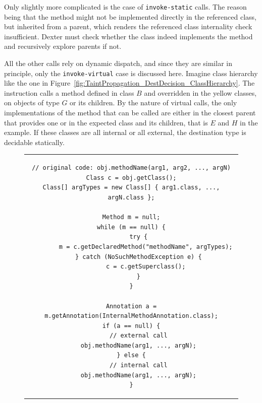 \documentclass[12pt,twoside,notitlepage]{report}
\begin{document}
Only slightly more complicated is the case of \verb$invoke-static$ calls. The reason being that the method might not be implemented directly in the referenced class, but inherited from a parent, which renders the referenced class internality check insufficient. Dexter must check whether the class indeed implements the method and recursively explore parents if not.

All the other calls rely on dynamic dispatch, and since they are similar in principle, only the \verb$invoke-virtual$ case is discussed here. Imagine class hierarchy like the one in Figure~\ref{fig:TaintPropagation_DestDecision_ClassHierarchy}. The instruction calls a method defined in class $B$ and overridden in the yellow classes, on objects of type $G$ or its children. By the nature of virtual calls, the only implementations of the method that can be called are either in the closest parent that provides one or in the expected class and its children, that is $E$ and $H$ in the example. If these classes are all internal or all external, the destination type is decidable statically. 

\begin{figure}
	\centering
	\begin{tabular}{c}
	\begin{lstlisting}
// original code: obj.methodName(arg1, arg2, ..., argN)
Class c = obj.getClass();
Class[] argTypes = new Class[] { arg1.class, ..., argN.class };

Method m = null;
while (m == null) {
	try {
 		m = c.getDeclaredMethod("methodName", argTypes);
 	} catch (NoSuchMethodException e) {
 		c = c.getSuperclass();
 	}
}

Annotation a = m.getAnnotation(InternalMethodAnnotation.class);
if (a == null) {
	// external call
	obj.methodName(arg1, ..., argN);
} else {
	// internal call
	obj.methodName(arg1, ..., argN);
}
	\end{lstlisting}
	\end{tabular}
	\begin{lstlisting}[caption={Destination-deciding instrumentation for non-public methods},
	                   label={listing:TaintPropagation_MethodCall_DestDecidability_NonPublic}]
	\end{lstlisting}
\end{figure}
\end{document}
